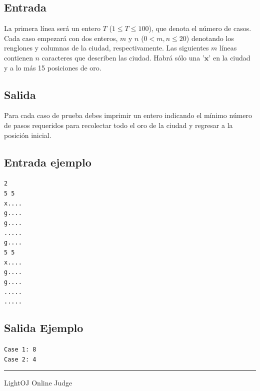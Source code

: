 \documentclass[letter,10pt]{article}
\newcommand{\lyxaddress}[1]{
\par {\raggedright #1
\vspace{1.4em}
\noindent\par}
}
\begin{document}
\subsection*{Entrada}

La primera línea será un entero $T$ ($1 \leq T \leq 100$), que denota el número de casos.
Cada caso empezará con dos enteros, $m$ y $n$ ($0 < m, n \leq 20$) denotando los renglones y columnas de la ciudad, respectivamente. Las siguientes $m$ líneas contienen $n$ caracteres que describen las ciudad. Habrá sólo una '$\textbf{x}$'  en la ciudad y a lo más 15 posiciones de oro.

\subsection*{Salida}

Para cada caso de prueba debes imprimir un entero indicando el mínimo número de pasos requeridos para recolectar todo el oro de la ciudad y regresar a la posición inicial.

\subsection*{Entrada ejemplo}

\noindent \texttt{2}~\\
\texttt{5 5}~\\
\texttt{x....}~\\
\texttt{g....}~\\
\texttt{g....}~\\
\texttt{.....}~\\
\texttt{g....}~\\
\texttt{5 5}~\\
\texttt{x....}~\\
\texttt{g....}~\\
\texttt{g....}~\\
\texttt{.....}~\\
\texttt{.....}~\\
\noindent 

\subsection*{Salida Ejemplo}

\noindent \texttt{Case 1: 8}~\\
\texttt{Case 2: 4}~\\

\noindent \rule[0.5ex]{1\columnwidth}{1pt}


\lyxaddress{LightOJ Online Judge}
\end{document}
